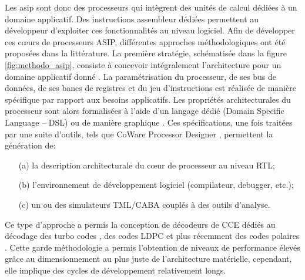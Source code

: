 \documentclass[../main.tex]{subfiles}
\begin{document}
Les \acrshort{asip} sont donc des processeurs qui intègrent des unités de calcul dédiées à un domaine applicatif. Des instructions assembleur dédiées permettent au développeur d’exploiter ces fonctionnalités au niveau logiciel. Afin de développer ces cœurs de processeurs ASIP, différentes approches méthodologiques ont été proposées dans la littérature. La première stratégie, schématisée dans la figure \ref{fig:methodo_asip}, consiste à concevoir intégralement l’architecture pour un domaine applicatif donné \cite{ASIP:1, ASIP:2}. La paramétrisation du processeur, de ses bus de données, de ses bancs de registres et du jeu d’instructions est réalisée de manière spécifique par rapport aux besoins applicatifs. Les propriétés architecturales du processeur sont alors formalisées à l’aide d’un langage dédié (Domain Specific Language – DSL)  \cite{ASIP:DSL:1,ASIP:DSL:2,ASIP:DSL:3} ou de manière graphique \cite{ASIP:PC:SC}. Ces spécifications, une fois traitées par une suite d’outils, tels que CoWare Processor Designer \cite{Coware:1,Coware:2}, permettent la génération de:
\begin{itemize}
    \item[(a)] la description architecturale du cœur de processeur au niveau RTL;
    \item[(b)] l’environnement de développement logiciel (compilateur, debugger, etc.);
    \item[(c)] un ou des simulateurs TML/CABA couplés à des outils d’analyse.
\end{itemize}

Ce type d’approche a permis la conception de décodeurs de CCE dédiés au décodage des turbo codes \cite{Ref_FlexFEC}, des codes LDPC \cite{Ref_Flexichap} et plus récemment des codes polaires \cite{ASIP:PC:SC}. Cette garde méthodologie a permis l’obtention de niveaux de performance élevés grâce au dimensionnement au plus juste de l’architecture matérielle, cependant, elle implique des cycles de développement relativement longs.
\end{document}
